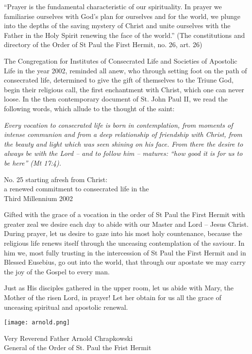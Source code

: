 {``Prayer is the fundamental characteristic of our spirituality. In prayer we familiarise ourselves with God's plan for ourselves and for the world, we plunge into the depths of the saving mystery of Christ and unite ourselves with the Father in the Holy Spirit renewing the face of the world.'' (The constitutions and directory of the Order of St Paul the First Hermit, no. 26, art. 26)\par}

{The Congregation for Institutes of Consecrated Life and Societies of Apostolic Life in the year 2002, reminded all anew, who through setting foot on the path of consecrated life, determined to give the gift of themselves to the Triune God, begin their religious call, the first enchantment with Christ, which one can never loose. In the then contemporary document of St. John Paul II, we read the following words, which allude to the thought of the saint:\par}

\begin{addmargin}[2em]{2em}
\textit{Every vocation to consecrated life is born in contemplation, from moments of intense communion and from a deep relationship of friendship with Christ, from the beauty and light which was seen shining on his face. From there the desire to always be with the Lord -- and to follow him -- matures: ``how good it is for us to be here'' (Mt 17:4).}
\end{addmargin}

\begin{flushright}
No. 25 starting afresh from Christ: \\ a renewed commitment to consecrated life in the  \\ Third Millennium 2002
\end{flushright}


{Gifted with the grace of a vocation in the order of St Paul the First Hermit with greater zeal we desire each day to abide with our Master and Lord -- Jesus Christ. During prayer, let us desire to gaze into his most holy countenance, because the religious life renews itself through the unceasing contemplation of the saviour. In him we, most fully trusting in the intercession of St Paul the First Hermit and in Blessed Eusebius, go out into the world, that through our apostate we may carry the joy of the Gospel to every man.\par}


{Just as His disciples gathered in the upper room, let us abide with Mary, the Mother of the risen Lord, in prayer! Let her obtain for us all the grace of unceasing spiritual and apostolic renewal.\par}


\begin{flushright}
    \texttt{[image: arnold.png]}

    Very Reverend Father Arnold Chrapkowski \\
    General of the Order of St. Paul the Frist Hermit
\end{flushright}

\setlength{\parskip}{0em}

\newpage
